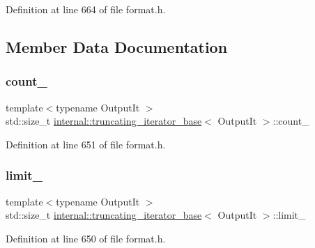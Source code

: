 Definition at line 664 of file format.\+h.



\subsection{Member Data Documentation}
\mbox{\label{classinternal_1_1truncating__iterator__base_acd98513e96d00a0d34164ad91533bbf7}} 
\subsubsection{\texorpdfstring{count\+\_\+}{count\_}}
{\footnotesize\ttfamily template$<$typename Output\+It $>$ \\
std\+::size\+\_\+t \hyperlink{classinternal_1_1truncating__iterator__base}{internal\+::truncating\+\_\+iterator\+\_\+base}$<$ Output\+It $>$\+::count\+\_\+\hspace{0.3cm}{\ttfamily [protected]}}



Definition at line 651 of file format.\+h.

\mbox{\label{classinternal_1_1truncating__iterator__base_ad244bae44f3628e1bd8f78584e404649}} 
\subsubsection{\texorpdfstring{limit\+\_\+}{limit\_}}
{\footnotesize\ttfamily template$<$typename Output\+It $>$ \\
std\+::size\+\_\+t \hyperlink{classinternal_1_1truncating__iterator__base}{internal\+::truncating\+\_\+iterator\+\_\+base}$<$ Output\+It $>$\+::limit\+\_\+\hspace{0.3cm}{\ttfamily [protected]}}



Definition at line 650 of file format.\+h.

